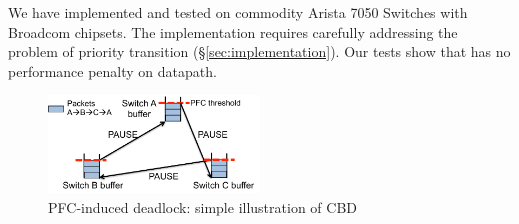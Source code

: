We have implemented and tested \sysname{} on commodity Arista 7050 Switches with
Broadcom chipsets. The implementation requires carefully addressing the problem
of priority transition (\S\ref{sec:implementation}). Our tests show that
\sysname{} has no performance penalty on datapath. 

\begin{figure}
	\centering
	\includegraphics[width=0.5\textwidth] {figs/deadlock}
	\vspace{-0.15in}
	\caption{PFC-induced deadlock: simple illustration of CBD}
	\vspace{-0.15in}
	\label{fig:deadlock_example}
\end{figure}
